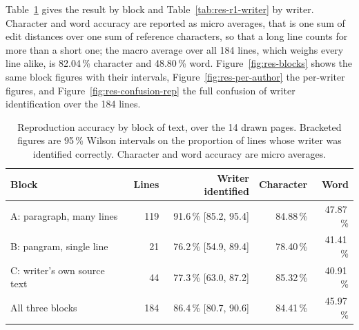         \medskip

        Table~\ref{tab:res-r1-blocks} gives the result by block and
        Table~\ref{tab:res-r1-writer} by writer. Character and word accuracy are
        reported as micro averages, that is one sum of edit distances over one
        sum of reference characters, so that a long line counts for more than a
        short one; the macro average over all 184 lines, which weighs every line
        alike, is 82.04\,\% character and 48.80\,\% word.
        Figure~\ref{fig:res-blocks} shows the same block figures with their
        intervals, Figure~\ref{fig:res-per-author} the per-writer figures, and
        Figure~\ref{fig:res-confusion-rep} the full confusion of writer
        identification over the 184 lines.

\begin{table}[h]
\centering
\fontsize{10}{12}\selectfont
\begin{tabular}{|l|r|r|r|r|}
\hline
\textbf{Block} & \textbf{Lines} & \textbf{Writer identified} & \textbf{Character} & \textbf{Word} \\
\hline
A: paragraph, many lines      & 119 & 91.6\,\% [85.2, 95.4] & 84.88\,\% & 47.87\,\% \\
B: pangram, single line       &  21 & 76.2\,\% [54.9, 89.4] & 78.40\,\% & 41.41\,\% \\
C: writer's own source text   &  44 & 77.3\,\% [63.0, 87.2] & 85.32\,\% & 40.91\,\% \\
\hline
All three blocks              & 184 & 86.4\,\% [80.7, 90.6] & 84.41\,\% & 45.97\,\% \\
\hline
\end{tabular}
\caption{Reproduction accuracy by block of text, over the 14 drawn pages.
Bracketed figures are 95\,\% Wilson intervals on the proportion of lines whose
writer was identified correctly. Character and word accuracy are micro
averages.}
\label{tab:res-r1-blocks}
\end{table}

